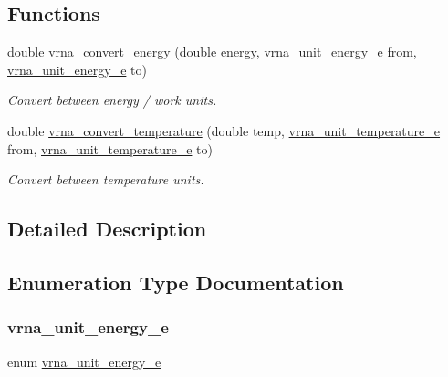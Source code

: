 \subsection*{Functions}
\begin{DoxyCompactItemize}
\item 
double \hyperlink{group__units_gada3216e97b410928ba19a4487e5fe6f2}{vrna\+\_\+convert\+\_\+energy} (double energy, \hyperlink{group__units_ga1d2fd1e73caf995e4dc69072b33e6ba5}{vrna\+\_\+unit\+\_\+energy\+\_\+e} from, \hyperlink{group__units_ga1d2fd1e73caf995e4dc69072b33e6ba5}{vrna\+\_\+unit\+\_\+energy\+\_\+e} to)
\begin{DoxyCompactList}\small\item\em Convert between energy / work units. \end{DoxyCompactList}\item 
double \hyperlink{group__units_gaf1bb1db32eba33b9f306214f5955d0c2}{vrna\+\_\+convert\+\_\+temperature} (double temp, \hyperlink{group__units_gadeca8d9e91ef85f1b652cc8aef63d7e4}{vrna\+\_\+unit\+\_\+temperature\+\_\+e} from, \hyperlink{group__units_gadeca8d9e91ef85f1b652cc8aef63d7e4}{vrna\+\_\+unit\+\_\+temperature\+\_\+e} to)
\begin{DoxyCompactList}\small\item\em Convert between temperature units. \end{DoxyCompactList}\end{DoxyCompactItemize}


\subsection{Detailed Description}


\subsection{Enumeration Type Documentation}
\mbox{\label{group__units_ga1d2fd1e73caf995e4dc69072b33e6ba5}} 
\subsubsection{\texorpdfstring{vrna\+\_\+unit\+\_\+energy\+\_\+e}{vrna\_unit\_energy\_e}}
{\footnotesize\ttfamily enum \hyperlink{group__units_ga1d2fd1e73caf995e4dc69072b33e6ba5}{vrna\+\_\+unit\+\_\+energy\+\_\+e}}



